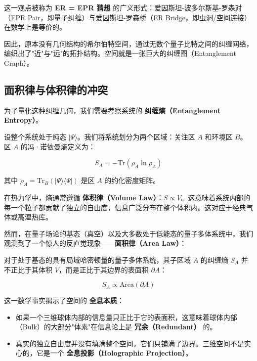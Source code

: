 这一观点被称为 \textbf{ER = EPR 猜想} 的广义形式：爱因斯坦-波多尔斯基-罗森对（EPR Pair，即量子纠缠）与爱因斯坦-罗森桥（ER Bridge，即虫洞/空间连接）在数学上是等价的。

因此，原本没有几何结构的希尔伯特空间，通过无数个量子比特之间的纠缠网络，编织出了"近"与"远"的拓扑结构。空间就是一张巨大的纠缠图（Entanglement Graph）。

\subsection{面积律与体积律的冲突}

为了量化这种纠缠几何，我们需要考察系统的 \textbf{纠缠熵（Entanglement Entropy）}。

设整个系统处于纯态 $|\Psi\rangle$。我们将系统划分为两个区域：关注区 $A$ 和环境区 $B$。区 $A$ 的冯·诺依曼熵定义为：

\begin{equation}
S_A = -\text{Tr}(\rho_A \ln \rho_A)
\end{equation}

其中 $\rho_A = \text{Tr}_B(|\Psi\rangle\langle\Psi|)$ 是区 $A$ 的约化密度矩阵。

在热力学中，熵通常遵循 \textbf{体积律（Volume Law）}：$S \propto V$。这意味着系统内部的每一个粒子都贡献了独立的自由度，信息广泛分布在整个体积内。这对应于经典气体或高温热库。

然而，在量子场论的基态（真空）以及大多数处于低能态的量子多体系统中，我们观测到了一个惊人的反直觉现象——\textbf{面积律（Area Law）}：

\begin{theorem}[纠缠熵面积律]
对于处于基态的具有局域哈密顿量的量子多体系统，其子区域 $A$ 的纠缠熵 $S_A$ 并不正比于其体积 $V$，而是正比于其边界的表面积 $\partial A$：

\begin{equation}
S_A \propto \text{Area}(\partial A)
\end{equation}
\end{theorem}

这一数学事实揭示了空间的 \textbf{全息本质}：

\begin{itemize}
\item 如果一个三维球体内部的信息量只正比于它的表面积，这意味着球体内部（Bulk）的大部分"体素"在信息论上是 \textbf{冗余（Redundant）} 的。

\item 真实的独立自由度并没有填满整个空间，它们只铺满了边界。三维空间不是实心的，它是一个 \textbf{全息投影（Holographic Projection）}。
\end{itemize}


